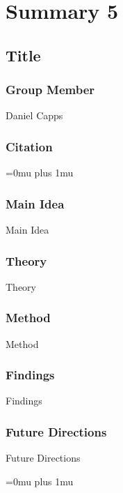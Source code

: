 \section{Summary 5}

\noindent
\subsection{Title}

\subsubsection{Group Member}

\noindent
Daniel Capps

\noindent
\subsubsection{Citation}

\Urlmuskip=0mu plus 1mu\relax

\subsubsection{Main Idea}

\noindent
Main Idea

\subsubsection{Theory}

\noindent
Theory

\subsubsection{Method}

\noindent
Method

\subsubsection{Findings}

\noindent
Findings

\subsubsection{Future Directions}

\noindent
Future Directions 

\Urlmuskip=0mu plus 1mu\relax

